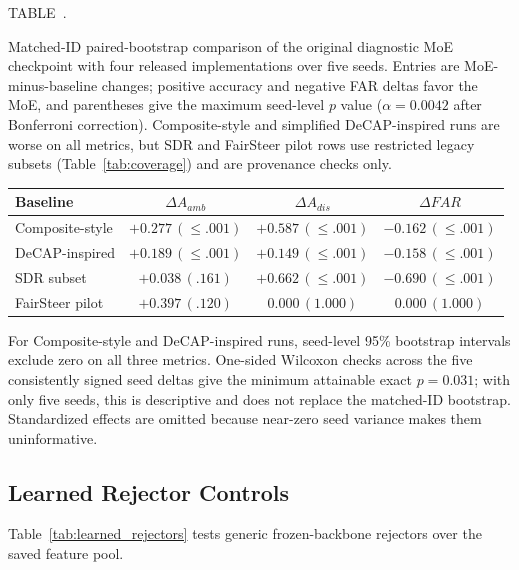 \documentclass{ieeeaccess}
\newcommand{\inlinetablecaption}[2]{%
  \par\vspace{0.62\baselineskip}\noindent
  \refstepcounter{table}\label{#1}%
  {\color{accessblue}\tablecapheadfont TABLE~\thetable.\ }%
  {\tablecapfont #2\par}%
  \vspace{6pt}%
}
\begin{document}
\noindent\begin{minipage}{\columnwidth}
\inlinetablecaption{tab:paired}{Matched-ID paired-bootstrap comparison of the original diagnostic MoE checkpoint with four released implementations over five seeds. Entries are MoE-minus-baseline changes; positive accuracy and negative FAR deltas favor the MoE, and parentheses give the maximum seed-level $p$ value ($\alpha=0.0042$ after Bonferroni correction). Composite-style and simplified DeCAP-inspired runs are worse on all metrics, but SDR and FairSteer pilot rows use restricted legacy subsets (Table~\ref{tab:coverage}) and are provenance checks only.}
\begin{center}
\scriptsize
\setlength{\tabcolsep}{2pt}
\begin{tabular}{@{}lccc@{}}
\toprule
Baseline & $\Delta A_{amb}$ & $\Delta A_{dis}$ & $\Delta FAR$ \\
\midrule
Composite-style & $+0.277\,(\leq.001)$ & $+0.587\,(\leq.001)$ & $-0.162\,(\leq.001)$ \\
DeCAP-inspired & $+0.189\,(\leq.001)$ & $+0.149\,(\leq.001)$ & $-0.158\,(\leq.001)$ \\
SDR subset & $+0.038\,(.161)$ & $+0.662\,(\leq.001)$ & $-0.690\,(\leq.001)$ \\
FairSteer pilot & $+0.397\,(.120)$ & $0.000\,(1.000)$ & $0.000\,(1.000)$ \\
\bottomrule
\end{tabular}
\end{center}
\end{minipage}
\par\vspace{0.5\baselineskip}

For Composite-style and DeCAP-inspired runs, seed-level 95\% bootstrap intervals exclude zero on all three metrics. One-sided Wilcoxon checks across the five consistently signed seed deltas give the minimum attainable exact $p=0.031$; with only five seeds, this is descriptive and does not replace the matched-ID bootstrap. Standardized effects are omitted because near-zero seed variance makes them uninformative.

\subsection{Learned Rejector Controls}
\label{app:rejector_audit}
Table~\ref{tab:learned_rejectors} tests generic frozen-backbone rejectors over the saved feature pool.
\end{document}
